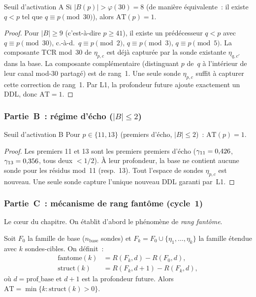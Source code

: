 \documentclass[12pt,a4paper]{article}
\begin{document}
\begin{thmbox}{Seuil d'activation A}
\label{thm:AT_A}
Si $|B(p)| > \varphi(30) = 8$ (de manière équivalente~: il existe
$q < p$ tel que $q \equiv p \pmod{30}$), alors $\mathrm{AT}(p) = 1$.
\end{thmbox}

\begin{proof}
Pour $|B| \ge 9$ (c'est-à-dire $p \ge 41$), il existe un prédécesseur
$q < p$ avec $q \equiv p \pmod{30}$, c.-à-d.\ $q \equiv p \pmod{2}$,
$q \equiv p \pmod{3}$, $q \equiv p \pmod{5}$. La composante TCR
mod~30 de $\eta_{p,c}$ est déjà capturée par la sonde existante
$\eta_{q,c'}$ dans la base. La composante complémentaire
(distinguant $p$ de~$q$ à l'intérieur de leur canal mod-30 partagé)
est de rang~1. Une seule sonde $\eta_{p,c}$ suffit à capturer cette
correction de rang~1. Par L1, la profondeur future ajoute exactement
un DDL, donc $\mathrm{AT} = 1$.
\end{proof}

\subsubsection{Partie~B~: régime d'écho ($|B| \le 2$)}

\begin{thmbox}{Seuil d'activation B}
\label{thm:AT_B}
Pour $p \in \{11, 13\}$ (premiers d'écho, $|B| \le 2$)~:
$\mathrm{AT}(p) = 1$.
\end{thmbox}

\begin{proof}
Les premiers 11 et 13 sont les premiers premiers d'écho
($\gamma_{11} = 0{,}426$, $\gamma_{13} = 0{,}356$, tous deux $< 1/2$). À
leur profondeur, la base ne contient aucune sonde pour les résidus
mod~11 (resp.\ 13). Tout l'espace de sondes $\eta_{p,c}$ est nouveau.
Une seule sonde capture l'unique nouveau DDL garanti par~L1.
\end{proof}

\subsubsection{Partie~C~: mécanisme de rang fantôme (cycle~1)}

Le c\oe ur du chapitre. On établit d'abord le phénomène de
\emph{rang fantôme}.

\begin{definition}
\label{def:phantom_struct}
Soit $F_0$ la famille de base ($n_{\mathrm{base}}$ sondes) et
$F_k = F_0 \cup \{\eta_1, \ldots, \eta_k\}$ la famille étendue avec
$k$ sondes-cibles. On définit~:
\begin{align}
  \mathrm{fantome}(k) &= R(F_k, d) - R(F_0, d), \label{eq:phantom}\\
  \mathrm{struct}(k) &= R(F_k, d{+}1) - R(F_k, d), \label{eq:struct}
\end{align}
où $d = \mathrm{prof\_base}$ et $d{+}1$ est la profondeur future.
Alors $\mathrm{AT} = \min\{k : \mathrm{struct}(k) > 0\}$.
\end{definition}
\end{document}
